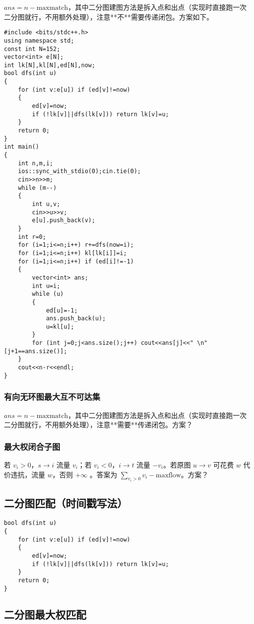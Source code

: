 \documentclass{ctexart}
\begin{document}
$ans=n-\text{maxmatch}$，其中二分图建图方法是拆入点和出点（实现时直接跑一次二分图就行，不用额外处理），注意**不**需要传递闭包。方案如下。

\begin{lstlisting}
#include <bits/stdc++.h>
using namespace std;
const int N=152;
vector<int> e[N];
int lk[N],kl[N],ed[N],now;
bool dfs(int u)
{
	for (int v:e[u]) if (ed[v]!=now)
	{
		ed[v]=now;
		if (!lk[v]||dfs(lk[v])) return lk[v]=u;
	}
	return 0;
}
int main()
{
	int n,m,i;
	ios::sync_with_stdio(0);cin.tie(0);
	cin>>n>>m;
	while (m--)
	{
		int u,v;
		cin>>u>>v;
		e[u].push_back(v);
	}
	int r=0;
	for (i=1;i<=n;i++) r+=dfs(now=i);
	for (i=1;i<=n;i++) kl[lk[i]]=i;
	for (i=1;i<=n;i++) if (ed[i]!=-1)
	{
		vector<int> ans;
		int u=i;
		while (u)
		{
			ed[u]=-1;
			ans.push_back(u);
			u=kl[u];
		}
		for (int j=0;j<ans.size();j++) cout<<ans[j]<<" \n"[j+1==ans.size()];
	}
	cout<<n-r<<endl;
}
\end{lstlisting}

\subsubsection{有向无环图最大互不可达集}

$ans=n-\text{maxmatch}$，其中二分图建图方法是拆入点和出点（实现时直接跑一次二分图就行，不用额外处理），注意**需要**传递闭包。方案？

\subsubsection{最大权闭合子图}

若 $v_i>0$，$s\to i$ 流量 $v_i$；若 $v_i<0$，$i\to t$ 流量 $-v_i$。若原图 $u\to v$ 可花费 $w$ 代价违抗，流量 $w$，否则 $+\infty$ 。答案为 $\sum\limits_{v_i>0} v_i-\text{maxflow}$。方案？

\subsection{二分图匹配（时间戳写法）}

\begin{lstlisting}
bool dfs(int u)
{
	for (int v:e[u]) if (ed[v]!=now)
	{
		ed[v]=now;
		if (!lk[v]||dfs(lk[v])) return lk[v]=u;
	}
	return 0;
}
\end{lstlisting}

\subsection{二分图最大权匹配}
\end{document}
